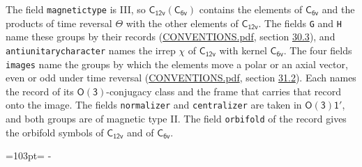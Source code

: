 \documentclass[10pt,a4paper]{article}
\newcommand{\needspace}[1]{\par\penalty-100\begingroup\dimen0=#1\relax\dimen2=\pagegoal
  \advance\dimen2-\pagetotal\ifdim\dimen0>\dimen2\relax\ifdim\dimen2>0pt\vfil\break\fi\fi
  \endgroup}
\numberwithin{equation}{section}
\newcommand{\grp}[1]{\mathsf{#1}}
\begin{document}
The field \texttt{magnetictype} is III, so $\grp{C_{12v}}(\grp{C_{6v}})$ contains the elements of $\grp{C_{6v}}$ and the products of time reversal $\varTheta$ with the other elements of $\grp{C_{12v}}$. The fields \texttt{G} and \texttt{H} name these groups by their records (\href{../../CONVENTIONS.pdf}{CONVENTIONS.pdf}, section \href{../../CONVENTIONS.pdf\#conv.30.3}{30.3}), and \texttt{antiunitarycharacter} names the irrep $\chi$ of $\grp{C_{12v}}$ with kernel $\grp{C_{6v}}$. The four fields \texttt{images} name the groups by which the elements move a polar or an axial vector, even or odd under time reversal (\href{../../CONVENTIONS.pdf}{CONVENTIONS.pdf}, section \href{../../CONVENTIONS.pdf\#conv.31.2}{31.2}). Each names the record of its $\grp{O(3)}$-conjugacy class and the frame that carries that record onto the image. The fields \texttt{normalizer} and \texttt{centralizer} are taken in $\grp{O(3)1'}$, and both groups are of magnetic type II. The field \texttt{orbifold} of the record gives the orbifold symbols of $\grp{C_{12v}}$ and of $\grp{C_{6v}}$.
\needspace{103pt}
\end{document}
